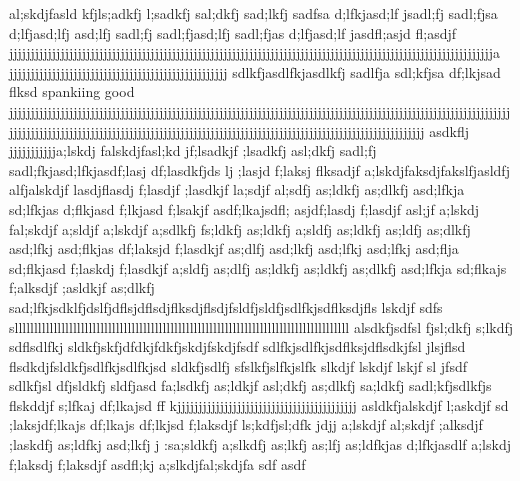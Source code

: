 al;skdjfasld kfjls;adkfj l;sadkfj sal;dkfj                                        sad;lkfj sadfsa d;lfkjasd;lf jsadl;fj sadl;fjsa d;lfjasd;lfj asd;lfj sadl;fj     sadl;fjasd;lfj sadl;fjas d;lfjasd;lf jasdfl;asjd fl;asdjf   jjjjjjjjjjjjjjjjjjjjjjjjjjjjjjjjjjjjjjjjjjjjjjjjjjjjjjjjjjjjjjjjjjjjjjjjjjjjjjjjjjjjjjjjjjjjjjjjjjjjjjjjjjjjjjjjja         jjjjjjjjjjjjjjjjjjjjjjjjjjjjjjjjjjjjjjjjjjjjjjjjjjj                                                                                                                                               sdlkfjasdlfkjasdlkfj sadlfja sdl;kfjsa df;lkjsad flksd spankiing good jjjjjjjjjjjjjjjjjjjjjjjjjjjjjjjjjjjjjjjjjjjjjjjjjjjjjjjjjjjjjjjjjjjjjjjjjjjjjjjjjjjjjjjjjjjjjjjjjjjjjjjjjjjjjjjjjjjjjjjjjjjjjjjjjjjjjjjjjjjjjjjjjjjjjjjjjjjjjjjjjjjjjjjjjjjjjjjjjjjjjjjjjjjjjjjjjjjjjjjjjjjjjjjjjjjjjj                                                                                                          asdkflj jjjjjjjjjjja;lskdj falskdjfasl;kd jf;lsadkjf ;lsadkfj asl;dkfj sadl;fj sadl;fkjasd;lfkjasdf;lasj df;lasdkfjds lj ;lasjd f;laksj flksadjf                                                                        a;lskdjfaksdjfakslfjasldfj alfjalskdjf lasdjflasdj f;lasdjf ;lasdkjf la;sdjf al;sdfj as;ldkfj as;dlkfj asd;lfkja sd;lfkjas d;flkjasd f;lkjasd f;lsakjf                                                                          asdf;lkajsdfl; asjdf;lasdj f;lasdjf asl;jf                                                                              a;lskdj fal;skdjf a;sldjf a;lskdjf a;sdlkfj fs;ldkfj as;ldkfj a;sldfj as;ldkfj as;ldfj as;dlkfj asd;lfkj asd;flkjas df;laksjd f;lasdkjf as;dlfj asd;lkfj asd;lfkj asd;lfkj asd;flja sd;flkjasd f;laskdj f;lasdkjf a;sldfj as;dlfj as;ldkfj as;ldkfj as;dlkfj asd;lfkja sd;flkajs f;alksdjf ;asldkjf as;dlkfj sad;lfkjsdklfjdslfjdflsjdflsdjflksdjflsdjfsldfjsldfjsdlfkjsdflksdjfls lskdjf sdfs sllllllllllllllllllllllllllllllllllllllllllllllllllllllllllllllllllllllllllllllllllllll                                                                         alsdkfjsdfsl fjsl;dkfj s;lkdfj sdflsdlfkj                                                                      sldkfjskfjdfdkjfdkfjskdjfskdjfsdf                                               sdlfkjsdlfkjsdflksjdflsdkjfsl jlsjflsd flsdkdjfsldkfjsdlfkjsdlfkjsd sldkfjsdlfj                                                                     sfslkfjslfkjslfk slkdjf lskdjf lskjf sl jfsdf                                                                           sdlkfjsl dfjsldkfj sldfjasd fa;lsdkfj as;ldkjf asl;dkfj as;dlkfj sa;ldkfj sadl;kfjsdlkfjs flskddjf s;lfkaj df;lkajsd ff kjjjjjjjjjjjjjjjjjjjjjjjjjjjjjjjjjjjjjjjjjj                                                                                                                             asldkfjalskdjf l;askdjf sd                                                                              ;laksjdf;lkajs df;lkajs df;lkjsd f;laksdjf ls;kdfjsl;dfk jdjj                     a;lskdjf al;skdjf ;alksdjf ;laskdfj as;ldfkj asd;lkfj j                                                                                                                                                               :sa;sldkfj a;slkdfj as;lkfj as;lfj as;ldfkjas d;lfkjasdlf a;lskdj f;laksdj f;laksdjf asdfl;kj   a;slkdjfal;skdjfa sdf                               asdf 
